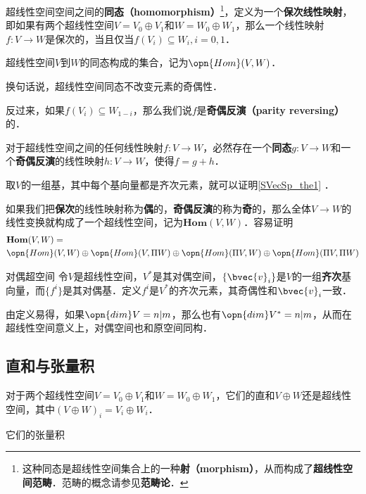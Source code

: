 超线性空间空间之间的\textbf{同态（homomorphism）}\footnote{这种同态是超线性空间集合上的一种\textbf{射（morphism）}，从而构成了\textbf{超线性空间范畴}．范畴的概念请参见\textbf{范畴论}．}，定义为一个\textbf{保次线性映射}，即如果有两个超线性空间$V=V_0\oplus V_1$和$W=W_0\oplus W_1$，那么一个线性映射$f:V\to W$是保次的，当且仅当$f(V_i)\subseteq W_i, i=0, 1$．

\begin{definition}{}
超线性空间$V$到$W$的同态构成的集合，记为$\opn{Hom}(V, W)$．
\end{definition}

换句话说，超线性空间同态不改变元素的奇偶性．

反过来，如果$f(V_i)\subseteq W_{1-i}$，那么我们说$f$是\textbf{奇偶反演（parity reversing）}的．

\begin{theorem}{}\label{SVecSp_the1}
对于超线性空间之间的任何线性映射$f:V\to W$，必然存在一个\textbf{同态}$g:V\to W$和一个\textbf{奇偶反演}的线性映射$h:V\to W$，使得$f=g+h$．
\end{theorem}

取$V$的一组基，其中每个基向量都是齐次元素，就可以证明\autoref{SVecSp_the1} ．

如果我们把\textbf{保次}的线性映射称为\textbf{偶}的，\textbf{奇偶反演}的称为\textbf{奇}的，那么全体$V\to W$的线性变换就构成了一个超线性空间，记为$\mathbf{Hom}(V, W)$．容易证明
\begin{equation}
\begin{aligned}
&\mathbf{Hom}(V, W)=\\&\opn{Hom}(V, W)\oplus\opn{Hom}(V, \Pi W)\oplus\opn{Hom}(\Pi V, W)\oplus\opn{Hom}(\Pi V, \Pi W)
\end{aligned}
\end{equation}

\begin{definition}{对偶超空间}
令$V$是超线性空间，$V^*$是其对偶空间，$\{\bvec{v}_i\}$是$V$的一组\textbf{齐次}基向量，而$\{f^i\}$是其对偶基．定义$f^i$是$V^*$的齐次元素，其奇偶性和$\bvec{v}_i$一致．
\end{definition}

由定义易得，如果$\opn{dim}V=n|m$，那么也有$\opn{dim}V^*=n|m$，从而在超线性空间意义上，对偶空间也和原空间同构．


\subsection{直和与张量积}

对于两个超线性空间$V=V_0\oplus V_1$和$W=W_0\oplus W_1$，它们的直和$V\oplus W$还是超线性空间，其中$(V\oplus W)_i=V_i\oplus W_i$．

它们的张量积























